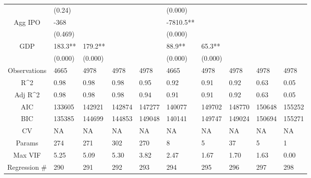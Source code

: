 \documentclass{article}
\begin{document}
\begin{table}[H]
\begin{tabular}{|clllllllll|}
   & (0.24) &  &  &  & (0.000) &  &  &  &  \\ 
  Agg IPO & -368 &  &  &  & -7810.5** &  &  &  &  \\ 
   & (0.469) &  &  &  & (0.000) &  &  &  &  \\ 
  GDP & 183.3** & 179.2** &  &  & 88.9** & 65.3** &  &  &  \\ 
   & (0.000) & (0.000) &  &  & (0.000) & (0.000) &  &  &  \\ 
  \hline 
 Observations & 4665 & 4978 & 4978 & 4978 & 4665 & 4978 & 4978 & 4978 & 4978 \\ 
  R^2 & 0.98 & 0.98 & 0.98 & 0.95 & 0.92 & 0.91 & 0.92 & 0.63 & 0.05 \\ 
  Adj R^2 & 0.98 & 0.98 & 0.98 & 0.94 & 0.91 & 0.91 & 0.92 & 0.63 & 0.05 \\ 
  AIC & 133605 & 142921 & 142874 & 147277 & 140077 & 149702 & 148770 & 150648 & 155252 \\ 
  BIC & 135385 & 144699 & 144853 & 149048 & 140141 & 149747 & 149024 & 150694 & 155271 \\ 
  CV & NA & NA & NA & NA & NA & NA & NA & NA & NA \\ 
  Params & 274 & 271 & 302 & 270 & 8 & 5 & 37 & 5 & 1 \\ 
  Max VIF & 5.25 & 5.09 & 5.30 & 3.82 & 2.47 & 1.67 & 1.70 & 1.63 & 0.00 \\ 
  Regression \# & 290 & 291 & 292 & 293 & 294 & 295 & 296 & 297 & 298 \\ 
   \hline
\end{tabular}
 
\end{table}
\end{document}
